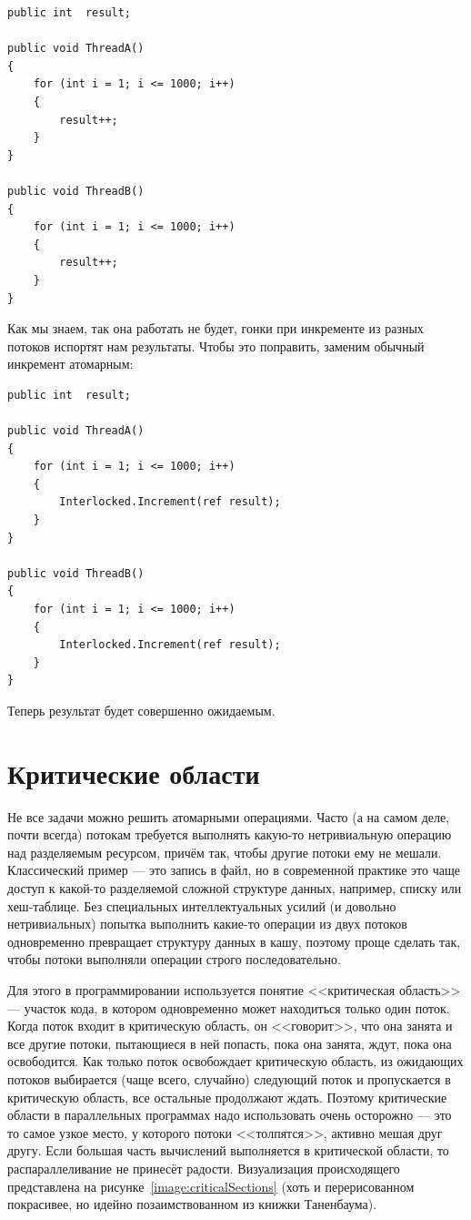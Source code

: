 \documentclass{../../text-style}
\begin{document}
\begin{verbatim}
public int  result;

public void ThreadA()
{
    for (int i = 1; i <= 1000; i++) 
    {
        result++;
    }
}

public void ThreadB()
{
    for (int i = 1; i <= 1000; i++) 
    {
        result++; 
    }
}
\end{verbatim}

Как мы знаем, так она работать не будет, гонки при инкременте из разных потоков испортят нам результаты. Чтобы это поправить, заменим обычный инкремент атомарным:

\begin{verbatim}
public int  result;

public void ThreadA()
{
    for (int i = 1; i <= 1000; i++) 
    {
        Interlocked.Increment(ref result);
    }
}

public void ThreadB()
{
    for (int i = 1; i <= 1000; i++) 
    {
        Interlocked.Increment(ref result); 
    }
}
\end{verbatim}

Теперь результат будет совершенно ожидаемым.

\section{Критические области}

Не все задачи можно решить атомарными операциями. Часто (а на самом деле, почти всегда) потокам требуется выполнять какую-то нетривиальную операцию над разделяемым ресурсом, причём так, чтобы другие потоки ему не мешали. Классический пример --- это запись в файл, но в современной практике это чаще доступ к какой-то разделяемой сложной структуре данных, например, списку или хеш-таблице. Без специальных интеллектуальных усилий (и довольно нетривиальных) попытка выполнить какие-то операции из двух потоков одновременно превращает структуру данных в кашу, поэтому проще сделать так, чтобы потоки выполняли операции строго последовательно.

Для этого в программировании используется понятие <<критическая область>> --- участок кода,  в котором одновременно может находиться только один поток. Когда поток входит в критическую область, он <<говорит>>, что она занята и все другие потоки, пытающиеся в ней попасть, пока она занята, ждут, пока она освободится. Как только поток освобождает критическую область, из ожидающих потоков выбирается (чаще всего, случайно) следующий поток и пропускается в критическую область, все остальные продолжают ждать. Поэтому критические области в параллельных программах надо использовать очень осторожно --- это то самое узкое место, у которого потоки <<толпятся>>, активно мешая друг другу. Если большая часть вычислений выполняется в критической области, то распараллеливание не принесёт радости. Визуализация происходящего представлена на рисунке~\ref{image:criticalSections} (хоть и перерисованном покрасивее, но идейно позаимствованном из книжки Таненбаума).
\end{document}
